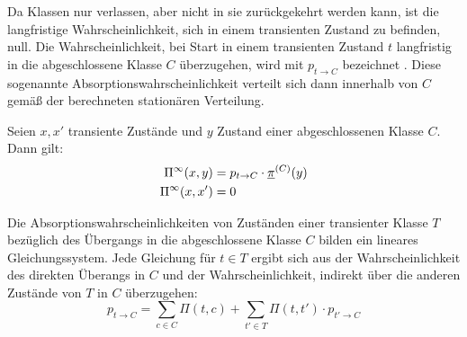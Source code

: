 \medskip

Da  Klassen nur verlassen, aber nicht in sie
zurückgekehrt werden kann, ist die langfristige Wahrscheinlichkeit, sich in
einem transienten Zustand zu befinden, null. Die Wahrscheinlichkeit, bei Start
in einem transienten Zustand $t$ langfristig in die abgeschlossene Klasse $C$
überzugehen, wird mit $p_{t\to C}$ bezeichnet . Diese sogenannte Absorptionswahrscheinlichkeit verteilt sich
dann innerhalb von $C$ gemäß der berechneten stationären Verteilung.

Seien $x,x'$ transiente Zustände und $y$ Zustand einer
abgeschlossenen Klasse $C$. Dann gilt:
\begin{align}
  \label{eq:lzv-trans-abg}
  \Pi^\infty(x,y) &= p_{t\to C}\cdot\underline{\pi}^{(C)}(y) \\
  \label{eq:lzv-trans-trans}
  \Pi^\infty(x,x') &= 0
\end{align}

Die Absorptionswahrscheinlichkeiten von Zuständen einer transienter Klasse $T$
bezüglich des Übergangs in die abgeschlossene Klasse $C$ bilden ein
lineares Gleichungssystem. Jede Gleichung für $t\in T$ ergibt sich
aus der Wahrscheinlichkeit des direkten Überangs in $C$ und der
Wahrscheinlichkeit, indirekt über die anderen Zustände von $T$ in $C$
überzugehen:
\[
p_{t\to C} = \sum_{c\in C} \Pi(t,c) + \sum_{t'\in T}\Pi(t,t')\cdot p_{t'\to C}
\]

